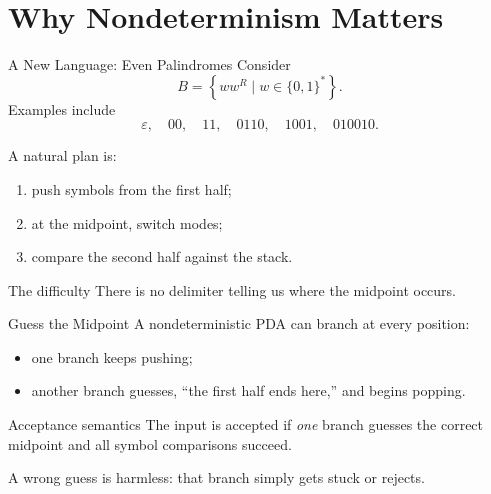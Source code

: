 \documentclass[aspectratio=169,10pt]{beamer}
\newcommand{\eps}{\varepsilon}
\newcommand{\lang}[1]{\left\{#1\right\}}
\begin{document}
\section{Why Nondeterminism Matters}

\begin{frame}{A New Language: Even Palindromes}
Consider
\[
B=\lang{ww^R\mid w\in\{0,1\}^{*}}.
\]
Examples include
\[
\eps,\quad 00,\quad 11,\quad 0110,\quad 1001,\quad 010010.
\]

A natural plan is:
\begin{enumerate}
    \item push symbols from the first half;
    \item at the midpoint, switch modes;
    \item compare the second half against the stack.
\end{enumerate}

\begin{alertblock}{The difficulty}
There is no delimiter telling us where the midpoint occurs.
\end{alertblock}
\end{frame}

\begin{frame}{Guess the Midpoint}
A nondeterministic PDA can branch at every position:

\begin{itemize}
    \item one branch keeps pushing;
    \item another branch guesses, ``the first half ends here,'' and begins popping.
\end{itemize}

\vspace{0.8em}
\begin{exampleblock}{Acceptance semantics}
The input is accepted if \emph{one} branch guesses the correct midpoint and all symbol comparisons succeed.
\end{exampleblock}

\vspace{0.6em}
A wrong guess is harmless: that branch simply gets stuck or rejects.
\end{frame}
\end{document}

